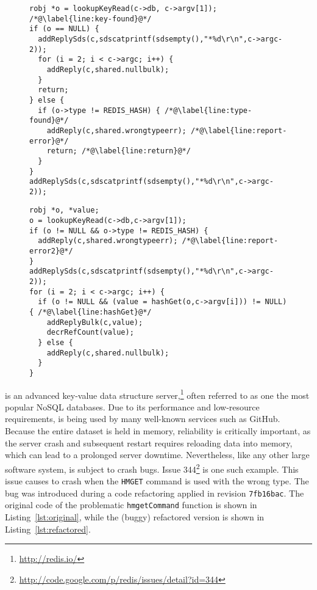 \begin{figure}[t]
\begin{minipage}[b]{0.90\columnwidth}
\begin{lstlisting}[label=lst:original, caption={Original (correct) version of the {\footnotesize \texttt{hmgetCommand}} function in \redis.}]
robj *o = lookupKeyRead(c->db, c->argv[1]); /*@\label{line:key-found}@*/
if (o == NULL) {
  addReplySds(c,sdscatprintf(sdsempty(),"*%d\r\n",c->argc-2));
  for (i = 2; i < c->argc; i++) {
    addReply(c,shared.nullbulk);
  }
  return;
} else {
  if (o->type != REDIS_HASH) { /*@\label{line:type-found}@*/
    addReply(c,shared.wrongtypeerr); /*@\label{line:report-error}@*/
    return; /*@\label{line:return}@*/
  }
}
addReplySds(c,sdscatprintf(sdsempty(),"*%d\r\n",c->argc-2));
\end{lstlisting}
\end{minipage}
\hspace{2.2\columnsep}
\begin{minipage}[b]{0.9\columnwidth}
\begin{lstlisting}[label=lst:refactored, caption={Refactored (buggy) version of the {\footnotesize \texttt{hmgetCommand}} function in \redis.}]
robj *o, *value;
o = lookupKeyRead(c->db,c->argv[1]);
if (o != NULL && o->type != REDIS_HASH) {
  addReply(c,shared.wrongtypeerr); /*@\label{line:report-error2}@*/
}
addReplySds(c,sdscatprintf(sdsempty(),"*%d\r\n",c->argc-2));
for (i = 2; i < c->argc; i++) {
  if (o != NULL && (value = hashGet(o,c->argv[i])) != NULL) { /*@\label{line:hashGet}@*/
    addReplyBulk(c,value);
    decrRefCount(value);
  } else {
    addReply(c,shared.nullbulk);
  }
}
\end{lstlisting}
\end{minipage}
\end{figure}

\redis is an advanced key-value data structure
server,\footnote{\url{http://redis.io/}} often referred to as one the most
popular NoSQL databases.  Due to its performance and low-resource requirements,
\redis is being used by many well-known services such as GitHub.  Because the
entire dataset is held in memory, reliability is critically important, as the
server crash and subsequent restart requires reloading data into memory, which
can lead to a prolonged server downtime. Nevertheless, like any
other large software system, \redis is subject to crash bugs.  Issue
344\footnote{\url{http://code.google.com/p/redis/issues/detail?id=344}} is one
such example.  This issue causes \redis to crash when the \lstinline`HMGET`
command is used with the wrong type.  The bug was introduced during a code
refactoring applied in revision \texttt{7fb16bac}.  The original code of the
problematic \lstinline`hmgetCommand` function is shown in
Listing~\ref{lst:original}, while the (buggy) refactored version is shown in
Listing~\ref{lst:refactored}.

